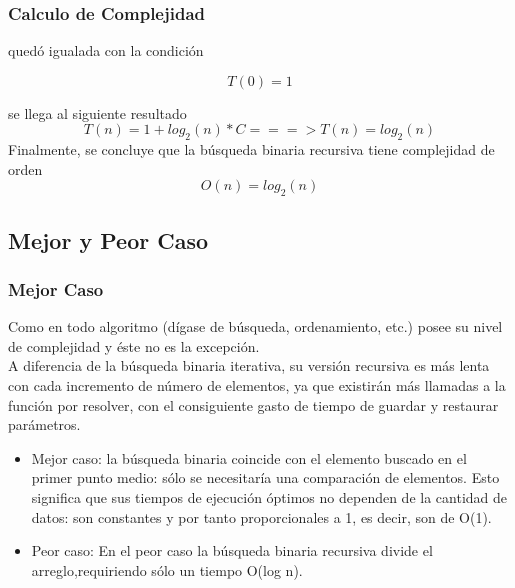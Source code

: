 \documentclass{beamer}
\begin{document}
	\begin{frame}
		\frametitle{Calculo de Complejidad}
		
		 quedó igualada con la condición 

	\begin{equation}
		T(0) = 1 
	\end{equation}

	se llega al siguiente resultado
             \begin{equation}
					T(n) = 1 + log_2 {(n)} * C ===> T(n) = log_2 {(n)}
				\end{equation}
		Finalmente, se concluye que la búsqueda binaria recursiva tiene complejidad de orden
				  \begin{equation}
					O(n) = log_2 {(n)}
				\end{equation}		
	\end{frame}



	\subsection{Mejor y Peor Caso}

		\begin{frame}
			\frametitle{Mejor Caso}
			\begin{center}
Como en todo algoritmo (dígase de búsqueda, ordenamiento, etc.) posee su nivel de complejidad y éste no es la excepción.\\
A diferencia de la búsqueda binaria iterativa, su versión recursiva es más lenta con cada incremento de número de elementos, ya que existirán más llamadas a la función por resolver, con el consiguiente gasto de tiempo de guardar y restaurar parámetros.

			\begin{itemize}[<+->]
				\item Mejor caso: la búsqueda binaria coincide con el elemento buscado en el primer punto medio: sólo se necesitaría una comparación de elementos. Esto significa que sus tiempos de ejecución óptimos no dependen de la cantidad de datos: son constantes y por tanto proporcionales a 1, es decir, son de O(1).
				
				\item Peor caso: En el peor caso la búsqueda binaria recursiva divide el arreglo,requiriendo sólo un tiempo O(log n).
			\end{itemize}			 
			\end{center}

		\end{frame}
	
\end{document}
